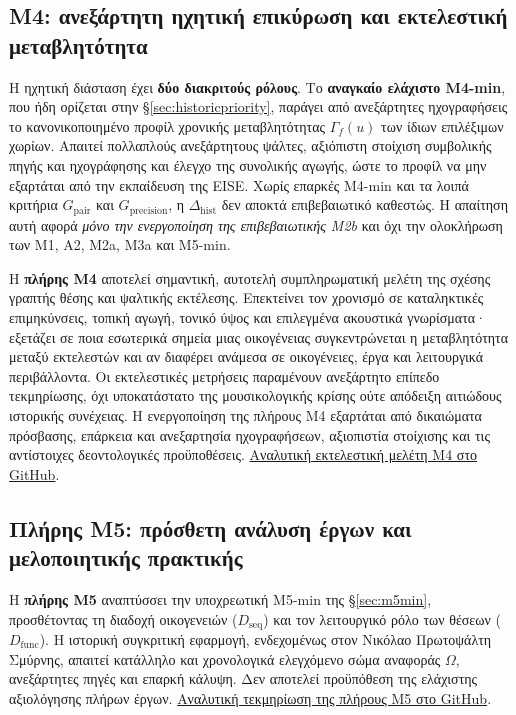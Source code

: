 \documentclass[a4paper]{article}
\newcommand{\dhist}{\ensuremath{\Delta_{\mathrm{hist}}}}
\begin{document}
\subsection{Μ4: ανεξάρτητη ηχητική επικύρωση και εκτελεστική μεταβλητότητα}\label{app:performance}
Η ηχητική διάσταση έχει \textbf{δύο διακριτούς ρόλους}. Το \textbf{αναγκαίο ελάχιστο Μ4-min}, που ήδη ορίζεται στην §\ref{sec:historicpriority}, παράγει από ανεξάρτητες ηχογραφήσεις το κανονικοποιημένο προφίλ χρονικής μεταβλητότητας $\Gamma_f(u)$ των ίδιων επιλέξιμων χωρίων. Απαιτεί πολλαπλούς ανεξάρτητους ψάλτες, αξιόπιστη στοίχιση συμβολικής πηγής και ηχογράφησης και έλεγχο της συνολικής αγωγής, ώστε το προφίλ να μην εξαρτάται από την εκπαίδευση της EISE. Χωρίς επαρκές Μ4-min και τα λοιπά κριτήρια $G_{\mathrm{pair}}$ και $G_{\mathrm{precision}}$, η $\dhist$ δεν αποκτά επιβεβαιωτικό καθεστώς. Η απαίτηση αυτή αφορά \emph{μόνο την ενεργοποίηση της επιβεβαιωτικής Μ2b} και όχι την ολοκλήρωση των Μ1, Α2, Μ2a, Μ3a και Μ5-min.

Η \textbf{πλήρης Μ4} αποτελεί σημαντική, αυτοτελή συμπληρωματική μελέτη της σχέσης γραπτής θέσης και ψαλτικής εκτέλεσης. Επεκτείνει τον χρονισμό σε καταληκτικές επιμηκύνσεις, τοπική αγωγή, τονικό ύψος και επιλεγμένα ακουστικά γνωρίσματα· εξετάζει σε ποια εσωτερικά σημεία μιας οικογένειας συγκεντρώνεται η μεταβλητότητα μεταξύ εκτελεστών και αν διαφέρει ανάμεσα σε οικογένειες, έργα και λειτουργικά περιβάλλοντα. Οι εκτελεστικές μετρήσεις παραμένουν ανεξάρτητο επίπεδο τεκμηρίωσης, όχι υποκατάστατο της μουσικολογικής κρίσης ούτε απόδειξη αιτιώδους ιστορικής συνέχειας. Η ενεργοποίηση της πλήρους Μ4 εξαρτάται από δικαιώματα πρόσβασης, επάρκεια και ανεξαρτησία ηχογραφήσεων, αξιοπιστία στοίχισης και τις αντίστοιχες δεοντολογικές προϋποθέσεις. \href{https://github.com/GeorgeSpy/byz-position-phd-study/blob/main/docs/full/07-validation.md#r063}{Αναλυτική εκτελεστική μελέτη Μ4 στο GitHub}.

\subsection{Πλήρης Μ5: πρόσθετη ανάλυση έργων και μελοποιητικής πρακτικής}\label{app:m5full}
Η \textbf{πλήρης Μ5} αναπτύσσει την υποχρεωτική Μ5-min της §\ref{sec:m5min}, προσθέτοντας τη διαδοχή οικογενειών ($D_{\mathrm{seq}}$) και τον λειτουργικό ρόλο των θέσεων ($D_{\mathrm{func}}$). Η ιστορική συγκριτική εφαρμογή, ενδεχομένως στον Νικόλαο Πρωτοψάλτη Σμύρνης, απαιτεί κατάλληλο και χρονολογικά ελεγχόμενο σώμα αναφοράς $\Omega$, ανεξάρτητες πηγές και επαρκή κάλυψη. Δεν αποτελεί προϋπόθεση της ελάχιστης αξιολόγησης πλήρων έργων. \href{https://github.com/GeorgeSpy/byz-position-phd-study/blob/main/docs/full/09-nikolaos.md}{Αναλυτική τεκμηρίωση της πλήρους Μ5 στο GitHub}.
\end{document}
